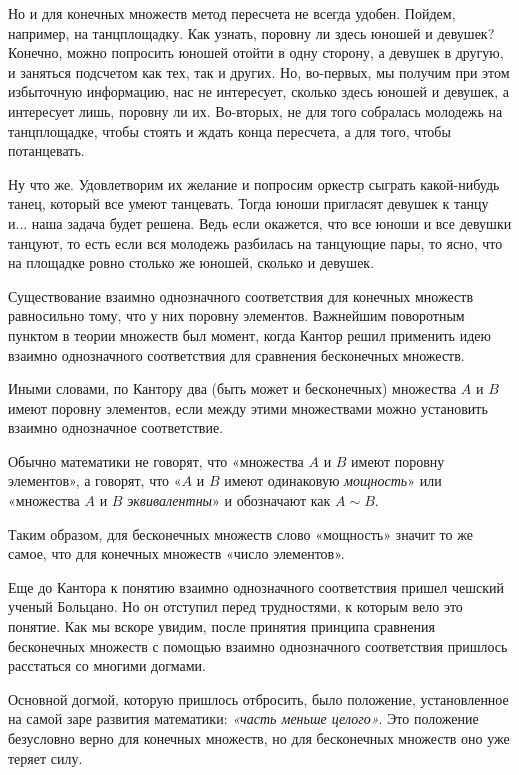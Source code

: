 \documentclass{article}
\begin{document}
Но и для конечных множеств метод пересчета не всегда удобен. Пойдем, например, на танцплощадку. Как узнать, поровну ли здесь юношей и девушек? Конечно, можно попросить юношей отойти в одну сторону, а девушек в другую, и заняться подсчетом как тех, так и других. Но, во-первых, мы получим при этом избыточную информацию, нас не интересует, сколько здесь юношей и девушек, а интересует лишь, поровну ли их. Во-вторых, не для того собралась молодежь на танцплощадке, чтобы стоять и ждать конца пересчета, а для того, чтобы потанцевать.

Ну что же. Удовлетворим их желание и попросим оркестр сыграть какой-нибудь танец, который все умеют танцевать. Тогда юноши пригласят девушек к танцу и... наша задача будет решена. Ведь если окажется, что все юноши и все девушки танцуют, то есть если вся молодежь разбилась на танцующие пары, то ясно, что на площадке ровно столько же юношей, сколько и девушек. \newline

Существование взаимно однозначного соответствия для конечных множеств равносильно тому, что у них поровну элементов. Важнейшим поворотным пунктом в теории множеств был момент, когда Кантор решил применить идею взаимно однозначного соответствия для сравнения бесконечных множеств.

Иными словами, по Кантору два (быть может и бесконечных) множества \(A\) и \(B\) имеют поровну элементов, если между этими множествами можно установить взаимно однозначное соответствие.

Обычно математики не говорят, что «множества \(A\) и \(B\) имеют поровну элементов», а говорят, что «\(A\) и \(B\) имеют одинаковую \textit{мощность}» или «множества \(A\) и \(B\) \textit{эквивалентны}» и обозначают как \(A \sim B\).

Таким образом, для бесконечных множеств слово «мощность» значит то же самое, что для конечных множеств «число элементов».

Еще до Кантора к понятию взаимно однозначного соответствия пришел чешский ученый Больцано. Но он отступил перед трудностями, к которым вело это понятие. Как мы вскоре увидим, после принятия принципа сравнения бесконечных множеств с помощью взаимно однозначного соответствия пришлось расстаться со многими догмами. \newline

Основной догмой, которую пришлось отбросить, было положение, установленное на самой заре развития математики: \textit{«часть меньше целого»}. Это положение безусловно верно для конечных множеств, но для бесконечных множеств оно уже теряет силу.
\end{document}
